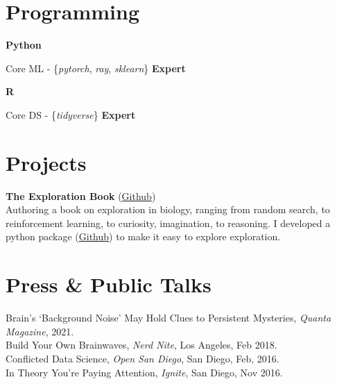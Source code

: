 \documentclass[margin,line]{res}
\newenvironment{list1}{
    \begin{list}{\ding{113}}{%
        \setlength{\itemsep}{0in}
        \setlength{\parsep}{0in} \setlength{\parskip}{0in}
        \setlength{\topsep}{0in} \setlength{\partopsep}{0in}
        \setlength{\leftmargin}{0.17in}}}{
    \end{list}}
\begin{document}
\begin{resume}
\section{\sc Programming}
\vspace{-.1cm}
{\bf Python}\\
\vspace*{-.15in}
\begin{list1}
    \tightlist
    \item[] Core ML - \{\emph{pytorch}, \emph{ray}, \emph{sklearn}\} \hfill {\bf Expert}
\end{list1}

\vspace{-.5cm}
{\bf R} \\
\vspace*{-.2in}
\begin{list1}
    \tightlist
    \item[] Core DS - \{\emph{tidyverse}\} \hfill {\bf Expert}
\end{list1}



\vspace{-.1cm}
\section{\sc Projects}
\vspace{-.1cm}
{\bf The Exploration Book} (\href{https://github.com/parenthetical-e/explorations-book}{Github}) \\
Authoring a book on exploration in biology, ranging from random search, to reinforcement learning, to curiosity, imagination, to reasoning. I developed a python package (\href{https://github.com/parenthetical-e/explorationlib}{Github}) to make it easy to explore exploration. 

\vspace{-.2cm}
\section{\sc Press \& Public Talks}
Brain's `Background Noise' May Hold Clues to Persistent Mysteries, \emph{Quanta Magazine}, 2021. \\
Build Your Own Brainwaves, \emph{Nerd Nite}, Los Angeles, Feb 2018. \\
Conflicted Data Science, \emph{Open San Diego}, San Diego, Feb, 2016. \\
In Theory You're Paying Attention, \emph{Ignite}, San Diego, Nov 2016. \\
    

\end{resume}
\end{document}

